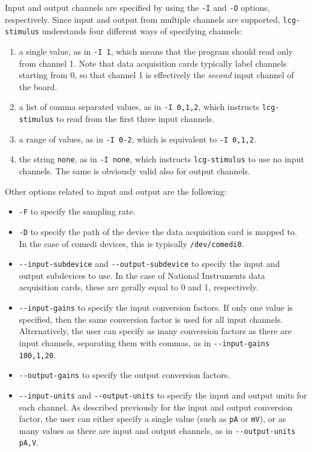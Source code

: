 Input and output channels are specified by using the \verb+-I+ and
\verb+-O+ options, respectively. Since input and output from multiple
channels are supported, \verb+lcg-stimulus+ understands four different
ways of specifying channels:
\begin{enumerate}
\item a single value, as in \verb+-I 1+, which means that the program
  should read only from channel 1. Note that data acquisition cards
  typically label channels starting from 0, so that channel 1 is
  effectively the \textit{second} input channel of the board.
\item a list of comma separated values, as in \verb+-I 0,1,2+, which
  instructs \verb+lcg-stimulus+ to read from the first three input
  channels.
\item a range of values, as in \verb+-I 0-2+, which is equivalent to
  \verb+-I 0,1,2+.
\item the string \verb+none+, as in \verb+-I none+, which instructs
  \verb+lcg-stimulus+ to use no input channels. The same is obviously
  valid also for output channels.
\end{enumerate}

Other options related to input and output are the following:
\begin{itemize}
\item \verb+-F+ to specify the sampling rate.
\item \verb+-D+ to specify the path of the device the data acquisition
  card is mapped to. In the case of comedi devices, this is typically
  \verb+/dev/comedi0+.
\item \verb+--input-subdevice+ and \verb+--output-subdevice+ to
  specify the input and output subdevices to use. In the case of
  National Instruments data acquisition cards, these are gerally equal
  to 0 and 1, respectively.
\item \verb+--input-gains+ to specify the input conversion factors. If
  only one value is specified, then the same conversion factor is used
  for all input channels. Alternatively, the user can specify as many
  conversion factors as there are input channels, separating them with
  commas, as in \verb+--input-gains 100,1,20+.
\item \verb+--output-gains+ to specify the output conversion factors.
\item \verb+--input-units+ and \verb+--output-units+ to specify the
  input and output units for each channel. As described previously for
  the input and output conversion factor, the user can either specify
  a single value (such as \verb+pA+ or \verb+mV+), or as many values
  as there are input and output channels, as in \verb+--output-units pA,V+.
\end{itemize}

